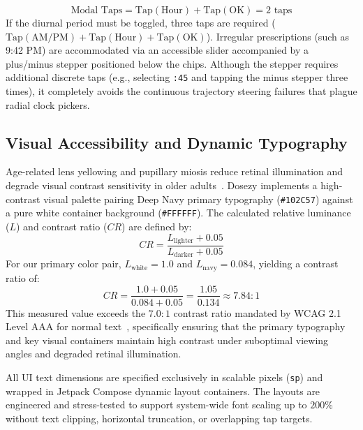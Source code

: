 \documentclass[11pt,a4paper]{article}
\begin{document}
\begin{enumerate}[leftmargin=*]
\begin{equation}
        \text{Modal Taps} = \text{Tap}(\text{Hour}) + \text{Tap}(\text{OK}) = 2\text{ taps}
    \end{equation}
    If the diurnal period must be toggled, three taps are required ($\text{Tap}(\text{AM/PM}) + \text{Tap}(\text{Hour}) + \text{Tap}(\text{OK})$). Irregular prescriptions (such as 9:42 PM) are accommodated via an accessible slider accompanied by a plus/minus stepper positioned below the chips. Although the stepper requires additional discrete taps (e.g., selecting \texttt{:45} and tapping the minus stepper three times), it completely avoids the continuous trajectory steering failures that plague radial clock pickers.
\end{enumerate}

\subsection{Visual Accessibility and Dynamic Typography}

Age-related lens yellowing and pupillary miosis reduce retinal illumination and degrade visual contrast sensitivity in older adults~\cite{fisk2009designing}. Dosezy implements a high-contrast visual palette pairing Deep Navy primary typography (\texttt{\#102C57}) against a pure white container background (\texttt{\#FFFFFF}). The calculated relative luminance ($L$) and contrast ratio ($CR$) are defined by:
\begin{equation}
    CR = \frac{L_{\text{lighter}} + 0.05}{L_{\text{darker}} + 0.05}
\end{equation}
For our primary color pair, $L_{\text{white}} = 1.0$ and $L_{\text{navy}} = 0.084$, yielding a contrast ratio of:
\begin{equation}
    CR = \frac{1.0 + 0.05}{0.084 + 0.05} = \frac{1.05}{0.134} \approx 7.84:1
\end{equation}
This measured value exceeds the $7.0:1$ contrast ratio mandated by WCAG 2.1 Level AAA for normal text~\cite{w3c2018wcag}, specifically ensuring that the primary typography and key visual containers maintain high contrast under suboptimal viewing angles and degraded retinal illumination.

All UI text dimensions are specified exclusively in scalable pixels (\texttt{sp}) and wrapped in Jetpack Compose dynamic layout containers. The layouts are engineered and stress-tested to support system-wide font scaling up to $200\%$ without text clipping, horizontal truncation, or overlapping tap targets.
\end{document}
